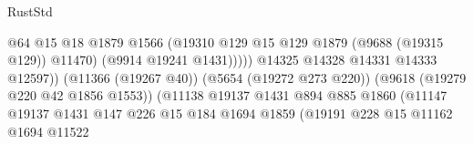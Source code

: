 \begin{lexlean}{RustStd}
\begin{coremodule}
                                                            @64
                                                            @15
                                                            @18
                                                            @1879
                                                            @1566
                                                            (@19310
                                                              @129
                                                              @15
                                                              @129
                                                              @1879
                                                              (@9688 (@19315 @129))
                                                              @11470)
                                                            (@9914 @19241 @1431)))))
                                                    @14325
                                                    @14328
                                                    @14331
                                                    @14333
                                                    @12597))
                                                (@11366 (@19267 @40))
                                                (@5654 (@19272 @273 @220))
                                                (@9618 (@19279 @220 @42 @1856 @1553))
                                                (@11138
                                                  @19137
                                                  @1431
                                                  @894
                                                  @885
                                                  @1860
                                                  (@11147
                                                    @19137
                                                    @1431
                                                    @147
                                                    @226
                                                    @15
                                                    @184
                                                    @1694
                                                    @1859
                                                    (@19191
                                                      @228
                                                      @15
                                                      @11162
                                                      @1694
                                                      @11522

\end{coremodule}
\end{lexlean}

